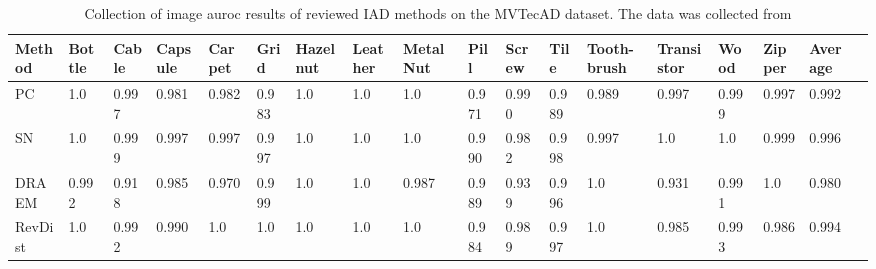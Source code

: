 \begin{table}[htbp]
    \tiny
    \centering
    \begin{tabularx}{\textwidth}{|X|X|X|X|X|X|X|X|X|X|X|X|X|X|X|X|X|X|}%
        \hline
        \textbf{Method} & \textbf{Bottle} & \textbf{Cable} & \textbf{Capsule} & \textbf{Carpet} & \textbf{Grid} & \textbf{Hazelnut} & \textbf{Leather} & \textbf{Metal Nut} & \textbf{Pill} & \textbf{Screw} & \textbf{Tile} & \textbf{Tooth-brush} & \textbf{Transistor} & \textbf{Wood} & \textbf{Zipper} & \textbf{Average} \\
        \hline
        PC \cite{patchCore2022} & 1.0 & 0.997 & 0.981 & 0.982 & 0.983 & 1.0 & 1.0 & 1.0 & 0.971 & 0.990 & 0.989 & 0.989 & 0.997 & 0.999 & 0.997 & 0.992 \\
        \hline
        SN \cite{liu2023simplenet} & 1.0 & 0.999 & 0.997 & 0.997 & 0.997 & 1.0 & 1.0 & 1.0 & 0.990 & 0.982 & 0.998 & 0.997 & 1.0 & 1.0 & 0.999 & 0.996 \\
       \hline
        DRAEM \cite{Zavrtanik_2021DRAEM} & 0.992 & 0.918 & 0.985 & 0.970 & 0.999 & 1.0 & 1.0 & 0.987 & 0.989 & 0.939 & 0.996 & 1.0 & 0.931 & 0.991 & 1.0 & 0.980 \\
        \hline
        RevDist \cite{revdist2023} & 1.0 & 0.992 & 0.990 & 1.0 & 1.0 & 1.0 & 1.0 & 1.0 & 0.984 & 0.989 & 0.997 & 1.0 & 0.985 & 0.993 & 0.986 & 0.994 \\
        \hline
    \end{tabularx}
    \caption{Collection of image auroc results of reviewed IAD methods on the MVTecAD \cite{MVTEC_Bergmann_2021} dataset. The data was collected from \cite{liu2024deep} \cite{liu2023simplenet} \cite{csflow2022} \cite{Zavrtanik_2021DRAEM} \cite{revdist2023}}
    \label{tab:imageaurocmvtec}
\end{table}

